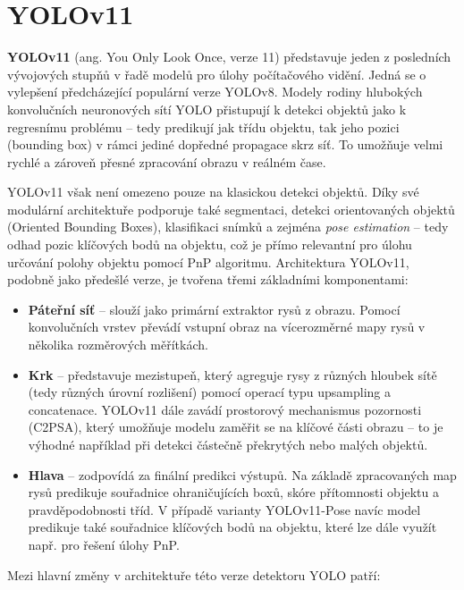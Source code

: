 \section{YOLOv11}
\label{sec:Chapter21}
\textbf{YOLOv11} (ang. You Only Look Once, verze 11) představuje jeden z posledních vývojových stupňů v řadě modelů pro úlohy počítačového vidění. Jedná se o vylepšení předcházející populární verze YOLOv8. Modely rodiny hlubokých konvolučních neuronových sítí YOLO přistupují k detekci objektů jako k regresnímu problému -- tedy predikují jak třídu objektu, tak jeho pozici (bounding box) v rámci jediné dopředné propagace skrz síť. To umožňuje velmi rychlé a zároveň přesné zpracování obrazu v reálném čase. 

YOLOv11 však není omezeno pouze na klasickou detekci objektů. Díky své modulární architektuře podporuje také segmentaci, detekci orientovaných objektů (Oriented Bounding Boxes), klasifikaci snímků a zejména \textit{pose estimation} -- tedy odhad pozic klíčových bodů na objektu, což je přímo relevantní pro úlohu určování polohy objektu pomocí PnP algoritmu. Architektura YOLOv11, podobně jako předešlé verze, je tvořena třemi základními komponentami:
\begin{itemize}
    \item \textbf{Páteřní síť} -- slouží jako primární extraktor rysů z obrazu. Pomocí konvolučních vrstev převádí vstupní obraz na vícerozměrné mapy rysů v několika rozměrových měřítkách.
    
    \item \textbf{Krk} -- představuje mezistupeň, který agreguje rysy z různých hloubek sítě (tedy různých úrovní rozlišení) pomocí operací typu upsampling a concatenace. YOLOv11 dále zavádí prostorový mechanismus pozornosti (C2PSA), který umožňuje modelu zaměřit se na klíčové části obrazu – to je výhodné například při detekci částečně překrytých nebo malých objektů.
    
    \item \textbf{Hlava} -- zodpovídá za finální predikci výstupů. Na základě zpracovaných map rysů predikuje souřadnice ohraničujících boxů, skóre přítomnosti objektu a pravděpodobnosti tříd. V případě varianty YOLOv11-Pose navíc model predikuje také souřadnice klíčových bodů na objektu, které lze dále využít např. pro řešení úlohy PnP.
\end{itemize}

\clearpage
Mezi hlavní změny v architektuře této verze detektoru YOLO patří:

